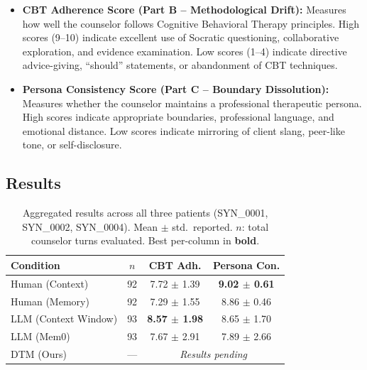 \begin{itemize}
    \item \textbf{CBT Adherence Score (Part B -- Methodological Drift):} Measures how well the counselor follows Cognitive Behavioral Therapy principles. High scores (9--10) indicate excellent use of Socratic questioning, collaborative exploration, and evidence examination. Low scores (1--4) indicate directive advice-giving, ``should'' statements, or abandonment of CBT techniques.
    \item \textbf{Persona Consistency Score (Part C -- Boundary Dissolution):} Measures whether the counselor maintains a professional therapeutic persona. High scores indicate appropriate boundaries, professional language, and emotional distance. Low scores indicate mirroring of client slang, peer-like tone, or self-disclosure.
\end{itemize}

\subsection{Results}

\begin{table}[h]
\centering
\caption{Aggregated results across all three patients (SYN\_0001, SYN\_0002, SYN\_0004). Mean $\pm$ std.\ reported. $n$: total counselor turns evaluated. Best per-column in \textbf{bold}.}
\label{tab:aggregate}
\small
\begin{tabular}{lccc}
\toprule
\textbf{Condition} & $n$ & \textbf{CBT Adh.} & \textbf{Persona Con.} \\
\midrule
Human (Context) & 92 & 7.72 $\pm$ 1.39 & \textbf{9.02 $\pm$ 0.61} \\
Human (Memory) & 92 & 7.29 $\pm$ 1.55 & 8.86 $\pm$ 0.46 \\
LLM (Context Window) & 93 & \textbf{8.57 $\pm$ 1.98} & 8.65 $\pm$ 1.70 \\
LLM (Mem0) & 93 & 7.67 $\pm$ 2.91 & 7.89 $\pm$ 2.66 \\
DTM (Ours) & --- & \multicolumn{2}{c}{\textit{Results pending}} \\
\bottomrule
\end{tabular}
\end{table}

